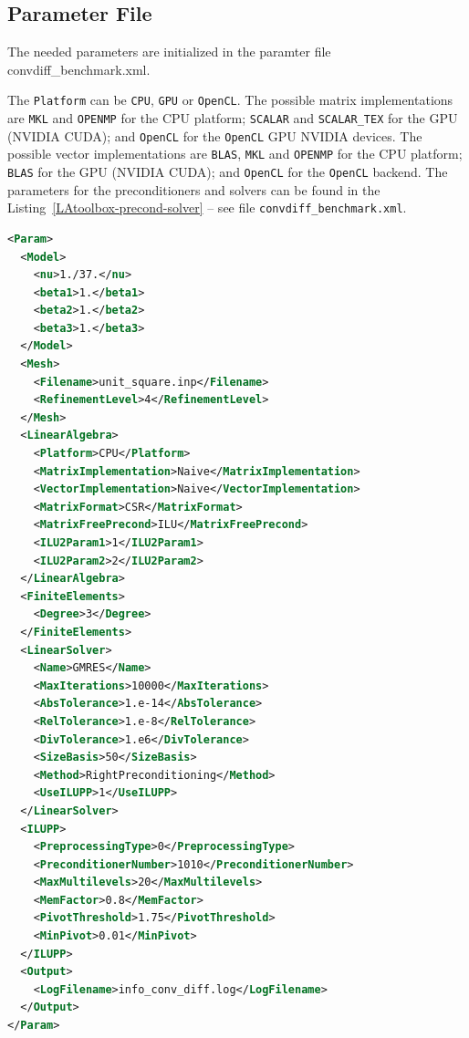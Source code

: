 \documentclass[a4paper, 11pt, twoside]{article}
\begin{document}
\subsection{Parameter File}\label{sectionparameter file}

The needed parameters are initialized in the paramter file
convdiff\_benchmark.xml.

The \verb'Platform' can be \verb'CPU', \verb'GPU' or \verb'OpenCL'. The
possible matrix implementations are \verb'MKL' and \verb'OPENMP' for the CPU
platform; \verb'SCALAR' and \verb'SCALAR_TEX' for the GPU (NVIDIA CUDA); and
\verb'OpenCL' for the \verb'OpenCL' GPU NVIDIA devices. The possible vector
implementations are \verb'BLAS', \verb'MKL' and \verb'OPENMP' for the CPU
platform; \verb'BLAS' for the GPU (NVIDIA CUDA); and \verb'OpenCL' for the
\verb'OpenCL' backend.
The parameters for the preconditioners and solvers can be found in the
Listing~\ref{LAtoolbox-precond-solver} -- see file \verb'convdiff_benchmark.xml'. 

\begin{lstlisting}[language=XML, basicstyle={\footnotesize, \ttfamily},
    keywordstyle=\color{blue}, numbers=none, tabsize=4] 
<Param>
  <Model>
    <nu>1./37.</nu>
    <beta1>1.</beta1>
    <beta2>1.</beta2>
    <beta3>1.</beta3>
  </Model>
  <Mesh>
    <Filename>unit_square.inp</Filename>
    <RefinementLevel>4</RefinementLevel>
  </Mesh>
  <LinearAlgebra>
    <Platform>CPU</Platform>
    <MatrixImplementation>Naive</MatrixImplementation>
    <VectorImplementation>Naive</VectorImplementation>
    <MatrixFormat>CSR</MatrixFormat>
    <MatrixFreePrecond>ILU</MatrixFreePrecond>
    <ILU2Param1>1</ILU2Param1>
    <ILU2Param2>2</ILU2Param2>
  </LinearAlgebra>
  <FiniteElements>
    <Degree>3</Degree>
  </FiniteElements>
  <LinearSolver>
    <Name>GMRES</Name>
    <MaxIterations>10000</MaxIterations>
    <AbsTolerance>1.e-14</AbsTolerance>
    <RelTolerance>1.e-8</RelTolerance>
    <DivTolerance>1.e6</DivTolerance>
    <SizeBasis>50</SizeBasis>
    <Method>RightPreconditioning</Method>
    <UseILUPP>1</UseILUPP>
  </LinearSolver>
  <ILUPP>
    <PreprocessingType>0</PreprocessingType>
    <PreconditionerNumber>1010</PreconditionerNumber>
    <MaxMultilevels>20</MaxMultilevels>
    <MemFactor>0.8</MemFactor>
    <PivotThreshold>1.75</PivotThreshold>
    <MinPivot>0.01</MinPivot>
  </ILUPP>
  <Output>
    <LogFilename>info_conv_diff.log</LogFilename>
  </Output>
</Param>
\end{lstlisting}
\end{document}
